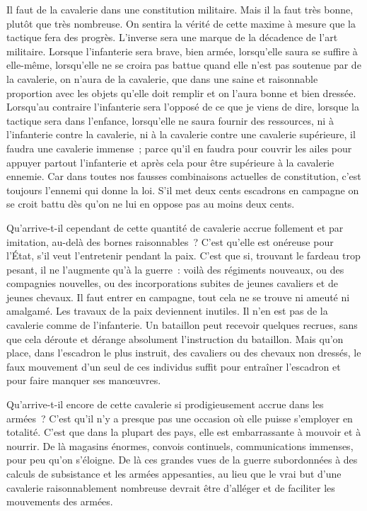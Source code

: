 \documentclass[french,twoside]{book} %
\begin{document}
Il faut de la cavalerie dans une constitution militaire. Mais il la faut très bonne, plutôt que très nombreuse. On sentira la vérité de cette maxime à mesure que la tactique fera des progrès. L’inverse sera une marque de la décadence de l’art militaire. Lorsque l’infanterie sera brave, bien armée, lorsqu’elle saura se suffire à elle-même, lorsqu’elle ne se croira pas battue quand elle n’est pas soutenue par de la cavalerie, on n’aura de la cavalerie, que dans une saine et raisonnable proportion avec les objets qu’elle doit remplir et on l’aura bonne et bien dressée. Lorsqu’au contraire l’infanterie sera l’opposé de ce que je viens de dire, lorsque la tactique sera dans l’enfance, lorsqu’elle ne saura fournir des ressources, ni à l’infanterie contre la cavalerie, ni à la cavalerie contre une cavalerie supérieure, il faudra une cavalerie immense ; parce qu’il en faudra pour couvrir les ailes pour appuyer partout l’infanterie et après cela pour être supérieure à la cavalerie ennemie. Car dans toutes nos fausses combinaisons actuelles de constitution, c’est toujours l’ennemi qui donne la loi. S’il met deux cents escadrons en campagne on se croit battu dès qu’on ne lui en oppose pas au moins deux cents.\par
Qu’arrive-t-il cependant de cette quantité de cavalerie accrue follement et par imitation, au-delà des bornes raisonnables ? C’est qu’elle est onéreuse pour l’État, s’il veut l’entretenir pendant la paix. C’est que si, trouvant le fardeau trop pesant, il ne l’augmente qu’à la guerre : voilà des régiments nouveaux, ou des compagnies nouvelles, ou des incorporations subites de jeunes cavaliers et de jeunes chevaux. Il faut entrer en campagne, tout cela ne se trouve ni ameuté ni amalgamé. Les travaux de la paix deviennent inutiles. Il n’en est pas de la cavalerie comme de l’infanterie. Un bataillon peut recevoir quelques recrues, sans que cela déroute et dérange absolument l’instruction du bataillon. Mais qu’on place, dans l’escadron le plus instruit, des cavaliers ou des chevaux non dressés, le faux mouvement d’un seul de ces individus suffit pour entraîner l’escadron et pour faire manquer ses manœuvres.\par
Qu’arrive-t-il encore de cette cavalerie si prodigieusement accrue dans les armées ? C’est qu’il n’y a presque pas une occasion où elle puisse s’employer en totalité. C’est que dans la plupart des pays, elle est embarrassante à mouvoir et à nourrir. De là magasins énormes, convois continuels, communications immenses, pour peu qu’on s’éloigne. De là ces grandes vues de la guerre subordonnées à des calculs de subsistance et les armées appesanties, au lieu que le vrai but d’une cavalerie raisonnablement nombreuse devrait être d’alléger et de faciliter les mouvements des armées.\par
\end{document}
